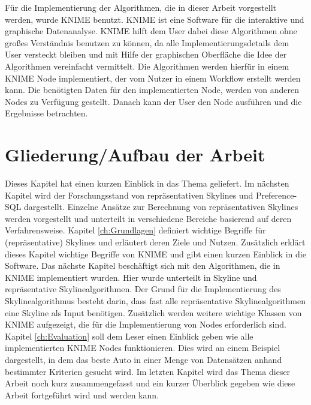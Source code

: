 Für die Implementierung der Algorithmen, die in dieser Arbeit vorgestellt werden, wurde KNIME benutzt. KNIME ist eine Software für die interaktive und graphische Datenanalyse. KNIME hilft dem User dabei diese Algorithmen ohne großes Verständnis benutzen zu können, da alle Implementierungsdetails dem User versteckt bleiben und mit Hilfe der graphischen Oberfläche die Idee der Algorithmen vereinfacht vermittelt. Die Algorithmen werden hierfür in einem KNIME Node implementiert, der vom Nutzer in einem Workflow erstellt werden kann. Die benötigten Daten für den implementierten Node, werden von anderen Nodes zu Verfügung gestellt. Danach kann der User den Node ausführen und die Ergebnisse betrachten. 
\section{Gliederung/Aufbau der Arbeit}
\label{ch:Einleitung:sec:Gliederung}
Dieses Kapitel hat einen kurzen Einblick in das Thema geliefert. Im nächsten Kapitel wird der Forschungsstand von repräsentativen Skylines und Preference-SQL dargestellt. Einzelne Ansätze zur Berechnung von repräsentativen Skylines werden vorgestellt und unterteilt in verschiedene Bereiche basierend auf deren Verfahrensweise. 
Kapitel \ref{ch:Grundlagen} definiert wichtige Begriffe für (repräsentative) Skylines und erläutert deren Ziele und Nutzen. Zusätzlich erklärt dieses Kapitel wichtige Begriffe von KNIME und gibt einen kurzen Einblick in die Software.
Das nächste Kapitel beschäftigt sich mit den Algorithmen, die in KNIME implementiert wurden. Hier wurde unterteilt in Skyline und repräsentative Skylinealgorithmen. Der Grund für die Implementierung des Skylinealgorithmus besteht darin, dass fast alle repräsentative Skylinealgorithmen eine Skyline als Input benötigen. Zusätzlich werden weitere wichtige Klassen von KNIME aufgezeigt, die für die Implementierung von Nodes erforderlich sind.
Kapitel \ref{ch:Evaluation} soll dem Leser einen Einblick geben wie alle implementierten KNIME Nodes funktionieren. Dies wird an einem Beispiel dargestellt, in dem das beste Auto in einer Menge von Datensätzen anhand bestimmter Kriterien gesucht wird. Im letzten Kapitel wird das Thema dieser Arbeit noch kurz zusammengefasst und ein kurzer Überblick gegeben wie diese Arbeit fortgeführt wird und werden kann.
